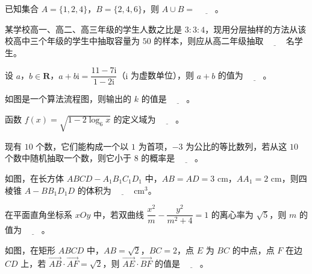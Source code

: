 \begin{question}
已知集合 $A=\{1,2,4\}$，$B=\{2,4,6\}$，则 $A\cup B=$ $\underline{\qquad}$。

\end{question}
\begin{question}
某学校高一、高二、高三年级的学生人数之比是 $3:3:4$，现用分层抽样的方法从该校高中三个年级的学生中抽取容量为 $50$ 的样本，则应从高二年级抽取 $\underline{\qquad}$ 名学生。

\end{question}
\begin{question}
设 $a$，$b\in\mathbf R$，$a+b\mathrm i=\dfrac{11-7\mathrm i}{1-2\mathrm i}$（$\mathrm i$ 为虚数单位），则 $a+b$ 的值为 $\underline{\qquad}$。

\Needspace{0.4\textheight}
\end{question}
\begin{question}
如图是一个算法流程图，则输出的 $k$ 的值是 $\underline{\qquad}$。
\nopagebreak[4]
\begin{center}\end{center}
\nopagebreak[4]
\end{question}
\begin{question}
函数 $f(x)=\sqrt{1-2\log_6x}$ 的定义域为 $\underline{\qquad}$。

\end{question}
\begin{question}
现有 $10$ 个数，它们能构成一个以 $1$ 为首项，$-3$ 为公比的等比数列，若从这 $10$ 个数中随机抽取一个数，则它小于 $8$ 的概率是 $\underline{\qquad}$。

\Needspace{0.4\textheight}
\end{question}
\begin{question}
如图，在长方体 $ABCD-A_1B_1C_1D_1$ 中，$AB=AD=3$ cm，$AA_1=2$ cm，则四棱锥 $A-BB_1D_1D$ 的体积为 $\underline{\qquad}$ cm$^3$。
\nopagebreak[4]
\begin{center}\end{center}
\nopagebreak[4]
\end{question}
\begin{question}
在平面直角坐标系 $xOy$ 中，若双曲线 $\dfrac{x^2}{m}-\dfrac{y^2}{m^2+4}=1$ 的离心率为 $\sqrt5$，则 $m$ 的值为 $\underline{\qquad}$。

\Needspace{0.4\textheight}
\end{question}
\begin{question}
如图，在矩形 $ABCD$ 中，$AB=\sqrt2$，$BC=2$，点 $E$ 为 $BC$ 的中点，点 $F$ 在边 $CD$ 上，若 $\overrightarrow{AB}\cdot\overrightarrow{AF}=\sqrt2$，则 $\overrightarrow{AE}\cdot\overrightarrow{BF}$ 的值是 $\underline{\qquad}$。
\nopagebreak[4]
\begin{center}\end{center}
\nopagebreak[4]
\end{question}
